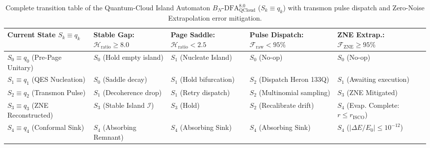 \documentclass[11pt,a4paper,reqno]{article}
\theoremstyle{plain}
\theoremstyle{definition}
\theoremstyle{remark}
\numberwithin{equation}{section}
\begin{document}
\begin{table}[htbp]
\centering
\footnotesize
\begin{tabularx}{\textwidth}{>{\raggedright\arraybackslash}X p{2.8cm} p{2.6cm} p{2.6cm} p{3.2cm}}
\toprule
\textbf{Current State $S_k \equiv q_k$} & \textbf{Stable Gap: $\mathcal{H}_{\mathrm{ratio}} \ge 8.0$} & \textbf{Page Saddle: $\mathcal{H}_{\mathrm{ratio}} < 2.5$} & \textbf{Pulse Dispatch: $\mathcal{F}_{\mathrm{raw}} < 95\%$} & \textbf{ZNE Extrap.: $\mathcal{F}_{\mathrm{ZNE}} \ge 95\%$} \\
\midrule
$S_0 \equiv q_0$ (Pre-Page Unitary) & $S_0$ (Hold empty island) & $S_1$ (Nucleate Island) & $S_0$ (No-op) & $S_0$ (No-op) \\
$S_1 \equiv q_1$ (QES Nucleation)   & $S_0$ (Saddle decay)     & $S_1$ (Hold bifurcation) & $S_2$ (Dispatch Heron 133Q) & $S_1$ (Awaiting execution) \\
$S_2 \equiv q_2$ (Transmon Pulse)   & $S_1$ (Decoherence drop) & $S_1$ (Retry dispatch)   & $S_2$ (Multinomial sampling)& $S_3$ (ZNE Mitigated) \\
$S_3 \equiv q_3$ (ZNE Reconstructed)& $S_3$ (Stable Island $\mathcal{I}$) & $S_3$ (Hold) & $S_2$ (Recalibrate drift)   & $S_4$ (Evap. Complete: $r \le r_{\mathrm{ISCO}}$) \\
$S_4 \equiv q_4$ (Conformal Sink)   & $S_4$ (Absorbing Remnant) & $S_4$ (Absorbing Sink)  & $S_4$ (Absorbing Sink)      & $S_4$ ($\lvert\Delta E/E_0\rvert \le 10^{-12}$) \\
\bottomrule
\end{tabularx}
\caption{Complete transition table of the Quantum-Cloud Island Automaton $B_N\text{-DFA}_{\mathrm{QCloud}}^{8.0}$ ($S_k \equiv q_k$) with transmon pulse dispatch and Zero-Noise Extrapolation error mitigation.}
\label{tab:quantum_cloud_automaton_transitions}
\end{table}
\end{document}
